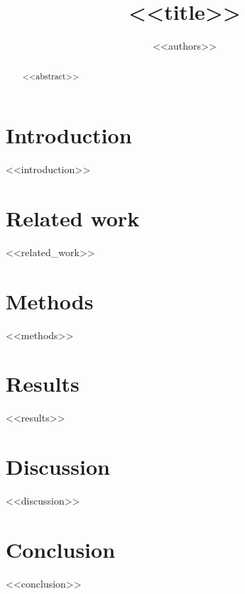\documentclass{article}
\title{<<title>>}
\author{<<authors>>}
\begin{document}
\maketitle

\begin{abstract}
<<abstract>>
\end{abstract}

\section{Introduction}
<<introduction>>

\section{Related work}
<<related_work>>

\section{Methods}
<<methods>>

\section{Results}
<<results>>

\section{Discussion}
<<discussion>>

\section{Conclusion}
<<conclusion>>



\end{document}

